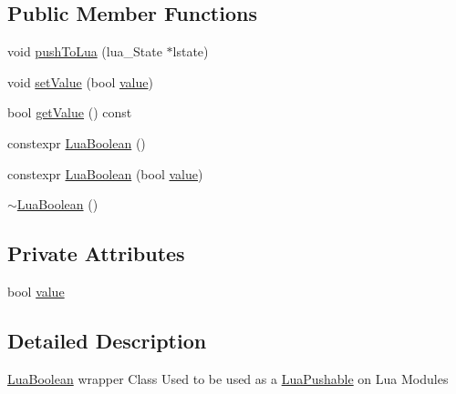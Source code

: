 \subsection*{Public Member Functions}
\begin{DoxyCompactItemize}
\item 
void \hyperlink{classZeta_1_1LuaBoolean_a8db81f14b50e4c0dee9fcd0a89f9df79}{push\+To\+Lua} (lua\+\_\+\+State $\ast$lstate)
\item 
void \hyperlink{classZeta_1_1LuaBoolean_aaab86c4734acde62aaee7ced8779639f}{set\+Value} (bool \hyperlink{classZeta_1_1LuaBoolean_ad22a5b12f437e27fa9b79e8765085ec7}{value})
\item 
bool \hyperlink{classZeta_1_1LuaBoolean_afc866fe0aee6611b33cb371d59eae327}{get\+Value} () const 
\item 
constexpr \hyperlink{classZeta_1_1LuaBoolean_aac4f895357a06b4857cd3f803c718802}{Lua\+Boolean} ()
\item 
constexpr \hyperlink{classZeta_1_1LuaBoolean_ae8aff03c5f0fc4b8d61d67774c037597}{Lua\+Boolean} (bool \hyperlink{classZeta_1_1LuaBoolean_ad22a5b12f437e27fa9b79e8765085ec7}{value})
\item 
\hyperlink{classZeta_1_1LuaBoolean_aabae7089a1497a39f954750de68233ca}{$\sim$\+Lua\+Boolean} ()
\end{DoxyCompactItemize}
\subsection*{Private Attributes}
\begin{DoxyCompactItemize}
\item 
bool \hyperlink{classZeta_1_1LuaBoolean_ad22a5b12f437e27fa9b79e8765085ec7}{value}
\end{DoxyCompactItemize}


\subsection{Detailed Description}
\hyperlink{classZeta_1_1LuaBoolean}{Lua\+Boolean} wrapper Class Used to be used as a \hyperlink{classZeta_1_1LuaPushable}{Lua\+Pushable} on Lua Modules 

